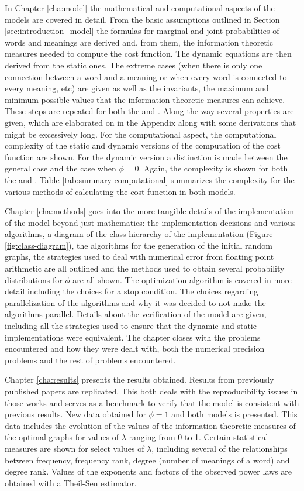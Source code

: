 In Chapter \ref{cha:model} the mathematical and computational aspects of the models are covered in detail.
From the basic assumptions outlined in Section \ref{sec:introduction_model} the formulas for marginal and joint probabilities of words and meanings are derived and, from them, the information theoretic measures needed to compute the cost function.
The dynamic equations are then derived from the static ones. The extreme cases (when there is only one connection between a word and a meaning or when every word is connected to every meaning, etc) are given as well as the invariants, the maximum and minimum possible values that the information theoretic measures can achieve.
These steps are repeated for both the \firstm{} and \secondmodel{}.
Along the way several properties are given, which are elaborated on in the Appendix along with some derivations that might be excessively long.
For the computational aspect, the computational complexity of the static and dynamic versions of the computation of the cost function are shown.
For the dynamic version a distinction is made between the general case and the case when $\phi=0$.
Again, the complexity is shown for both the \firstm{} and \secondmodel{}.
Table \ref{tab:summary-computational} summarizes the complexity for the various methods of calculating the cost function in both models.

Chapter \ref{cha:methods} goes into the more tangible details of the implementation of the model beyond just mathematics: the implementation decisions and various algorithms, a diagram of the class hierarchy of the implementation (Figure \ref{fig:class-diagram}), the algorithms for the generation of the initial random graphs, the strategies used to deal with numerical error from floating point arithmetic are all outlined and the methods used to obtain several probability distributions for $\phi$ are all shown.
The optimization algorithm is covered in more detail including the choices for a stop condition.
The choices regarding parallelization of the algorithms and why it was decided to not make the algorithms parallel.
Details about the verification of the model are given, including all the strategies used to ensure that the dynamic and static implementations were equivalent.
The chapter closes with the problems encountered and how they were dealt with, both the numerical precision problems and the rest of problems encountered.

Chapter \ref{cha:results} presents the results obtained.
Results from previously published papers \cite{Ferrer2005a} \cite{Ferrer2003a} are replicated.
This both deals with the reproducibility issues in those works and serves as a benchmark to verify that the model is consistent with previous results.
New data obtained for $\phi=1$ and both models is presented.
This data includes the evolution of the values of the information theoretic measures of the optimal graphs for values of $\lambda$ ranging from 0 to 1.
Certain statistical measures are shown for select values of $\lambda$, including several of the relationships between frequency, frequency rank, degree (number of meanings of a word) and degree rank.
Values of the exponents and factors of the observed power laws are obtained with a Theil-Sen estimator.

